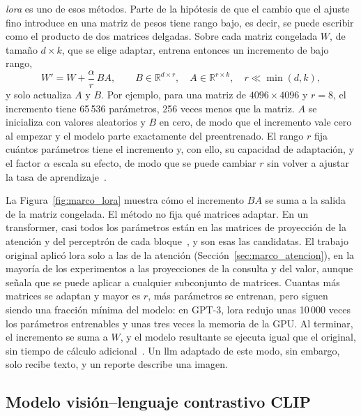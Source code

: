 \emph{\Gls{lora}} es uno de esos métodos. Parte de la hipótesis de que el cambio que el ajuste fino introduce en una
matriz de pesos tiene rango bajo, es decir, se puede escribir como el producto de dos matrices delgadas. Sobre
cada matriz congelada $W$, de tamaño $d \times k$, que se elige adaptar, entrena entonces un incremento de bajo
rango,
\begin{equation}
    W' = W + \frac{\alpha}{r}\,BA, \qquad B \in \mathbb{R}^{d\times r},\quad A \in \mathbb{R}^{r\times k},\quad
    r \ll \min(d, k),
    \label{eq:marco_lora}
\end{equation}
y solo actualiza $A$ y $B$. Por ejemplo, para una matriz de $4096 \times 4096$
y $r = 8$, el incremento tiene 65\,536 parámetros, 256 veces menos que la matriz. $A$ se inicializa con valores
aleatorios y $B$ en cero, de modo que el incremento vale cero al empezar y el modelo parte exactamente del
preentrenado. El rango $r$ fija cuántos parámetros tiene el incremento y, con ello, su capacidad de adaptación,
y el factor $\alpha$ escala su efecto, de modo que se puede cambiar $r$ sin volver a ajustar la tasa de
aprendizaje~\cite{hu2021lora}.



La Figura~\ref{fig:marco_lora} muestra cómo el incremento $BA$ se suma a la salida de la matriz congelada. El
método no fija qué matrices adaptar. En un transformer, casi todos los parámetros están en las matrices de
proyección de la atención y del perceptrón de cada bloque~\cite{kaplan2020scaling}, y son esas las candidatas.
El trabajo original aplicó \gls{lora} solo a las de la atención (Sección~\ref{sec:marco_atencion}), en la
mayoría de los experimentos a las proyecciones de la consulta y del valor, aunque señala que se puede aplicar a
cualquier subconjunto de matrices. Cuantas más matrices se adaptan y mayor es $r$, más parámetros se entrenan,
pero siguen siendo una fracción mínima del modelo: en GPT-3, \gls{lora} redujo unas 10\,000 veces los
parámetros entrenables y unas tres veces la memoria de la GPU. Al terminar, el incremento se suma a $W$, y el
modelo resultante se ejecuta igual que el original, sin tiempo de cálculo adicional~\cite{hu2021lora}. Un
\gls{llm} adaptado de este modo, sin embargo, solo recibe texto, y un reporte describe una imagen.

\subsection{Modelo visión--lenguaje contrastivo CLIP}
\label{sec:marco_vlm}
\label{sec:marco_vlm_clip}

